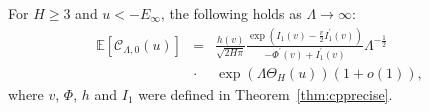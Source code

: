 \documentclass[twoside]{article}
\begin{document}
\begin{theorem}
For $H \geq 3$ and $u < -E_{\infty}$, the following holds as $\Lambda \rightarrow \infty$:
\begin{eqnarray*}
\mathbb{E}[\mathcal{C}_{\Lambda,0}(u)] \!\!\!&=&\!\!\! \frac{h(v)}{\sqrt{2H\pi}}\frac{\exp(I_1(v) - \frac{v}{2}I_1^{'}(v))}{-\Phi^{'}(v) + I_1^{'}(v)}\Lambda^{-\frac{1}{2}}\\
&\cdot& \exp\left(\Lambda\Theta_H(u)\right)(1 + o(1)),
\end{eqnarray*}
where $v$, $\Phi$, $h$ and $I_1$ were defined in Theorem~\ref{thm:cpprecise}.
\label{thm:lmspprecise}
\end{theorem}
\end{document}
